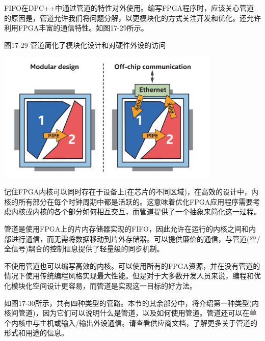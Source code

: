 FIFO在DPC++中通过管道的特性对外使用。编写FPGA程序时，应该关心管道的原因是，管道允许我们将问题分解，以更模块化的方式关注开发和优化。还允许利用FPGA丰富的通信特性。如图17-29所示。\par

\hspace*{\fill} \par %
图17-29 管道简化了模块化设计和对硬件外设的访问
\begin{center}
	\includegraphics[width=0.8\textwidth]{content/chapter-17/images/24}
\end{center}

记住FPGA内核可以同时存在于设备上(在芯片的不同区域)，在高效的设计中，内核的所有部分在每个时钟周期中都是活跃的。这意味着优化FPGA应用程序需要考虑内核或内核的各个部分如何相互交互，而管道提供了一个抽象来简化这一过程。\par

管道是使用FPGA上的片内存储器实现的FIFO，因此允许在运行的内核之间和内部进行通信，而无需将数据移动到片外存储器。可以提供廉价的通信，与管道(空/全信号)耦合的控制信息提供了轻量级的同步机制。\par

\begin{tcolorbox}[colback=blue!5!white,colframe=blue!75!black, title=我们需要管道吗?]
不使用管道也可以编写高效的内核。可以使用所有的FPGA资源，并在没有管道的情况下使用传统编程风格实现最大性能。但是对于大多数开发人员来说，编程和优化模块化空间设计更容易，而管道是实现这一目标的好方法。
\end{tcolorbox}

如图17-30所示，共有四种类型的管路。本节的其余部分中，将介绍第一种类型(内核间管道)，因为它们可以说明什么是管道，以及如何使用管道。管道还可以在单个内核中与主机或输入/输出外设通信。请查看供应商文档，了解更多关于管道的形式和用途的信息。\par

